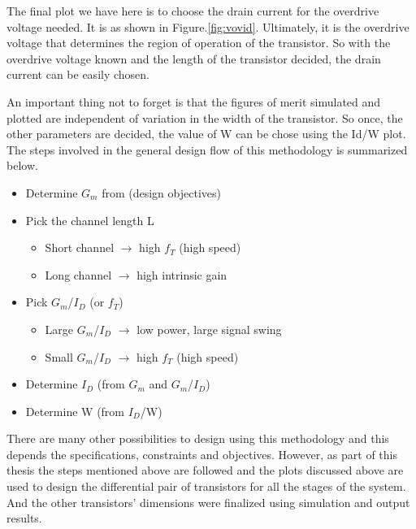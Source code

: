 The final plot we have here is to choose the drain current for the overdrive voltage needed. It is as shown in Figure.\ref{fig:vovid}. Ultimately, it is the overdrive voltage that determines the region of operation of the transistor. So with the overdrive voltage known and the length of the transistor decided, the drain current can be easily chosen.

An important thing not to forget is that the figures of merit simulated and plotted are independent of variation in the width of the transistor. So once, the other parameters are decided, the value of W can be chose using the Id/W plot. The steps involved in the general design flow of this methodology is summarized below.
\begin{itemize}
\item Determine $G_m$ from (design objectives)
\item Pick the channel length L
	\begin{itemize}
	\item Short channel $\rightarrow$ high $f_T$ (high speed)
	\item Long channel $\rightarrow$ high intrinsic gain
	\end{itemize}
\item Pick $G_m$/$I_D$ (or $f_T$)
	\begin{itemize}
	\item Large $G_m$/$I_D$ $\rightarrow$ low power, large signal swing
	\item Small $G_m$/$I_D$ $\rightarrow$ high $f_T$ (high speed)
	\end{itemize}
\item Determine $I_D$ (from $G_m$ and $G_m$/$I_D$)
\item Determine W (from $I_D$/W)
\end{itemize}

There are many other possibilities to design using this methodology and this depends the specifications, constraints and objectives. However, as part of this thesis the steps mentioned above are followed and the plots discussed above are used to design the differential pair of transistors for all the stages of the system. And the other transistors' dimensions were finalized using simulation and output results.